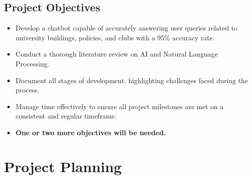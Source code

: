 \documentclass[12pt]{report}
\begin{document}
    \section{Project Objectives}
    \begin{itemize}
        \item Develop a chatbot capable of accurately answering user queries related to university 
        buildings, policies, and clubs with a 95\% accuracy rate.
        \item Conduct a thorough literature review on AI and Natural Language Processing.
        \item Document all stages of development, highlighting challenges faced during the process.
        \item Manage time effectively to ensure all project milestones are met on a consistent and regular timeframe.
        \item \large \textbf{One or two more objectives will be needed.}
    \end{itemize}


    \chapter{Project Planning}
\end{document}
